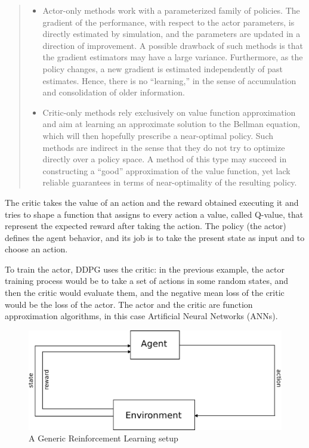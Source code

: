 \begin{quote}
\begin{itemize}
	\item Actor-only methods work with a parameterized family of policies. The gradient of the performance, with respect to the actor parameters, is directly estimated by simulation, and the parameters are updated in a  direction of improvement. A possible drawback of such methods is that the gradient estimators may have a  large variance. Furthermore, as the policy changes, a  new gradient is estimated independently of past estimates. Hence, there is no ``learning,'' in the sense of accumulation and consolidation of older information. 

	\item Critic-only methods rely exclusively on value function approximation and aim at learning an approximate solution to the Bellman equation, which will then hopefully prescribe a  near-optimal policy. Such methods are indirect in the sense that they do not try to optimize directly over a policy space. A method of this type may succeed in constructing a ``good'' approximation of the value function, yet lack reliable guarantees in terms of near-optimality of the resulting policy.
\end{itemize}
	\begin{flushright}
		\cite{konda2000actor}	
	\end{flushright}
\end{quote}
The critic takes the value of an action and the reward obtained executing it and tries to shape a function that assigns to every action a value, called Q-value, that represent the expected reward after taking the action. The policy (the actor) defines the agent behavior, and its job is to take the present state as input and to choose an action.

To train the actor, DDPG uses the critic: in the previous example, the actor training process would be to take a set of actions in some random states, and then the critic would evaluate them, and the negative mean loss of the critic would be the loss of the actor. The actor and the critic are function approximation algorithms, in this case Artificial Neural Networks (ANNs).

\begin{figure}[h]
	\centering
	\includegraphics[scale=0.4]{pictures/rl.pdf}
	\caption{A Generic Reinforcement Learning setup}
	\label{fig:rl}
\end{figure}

